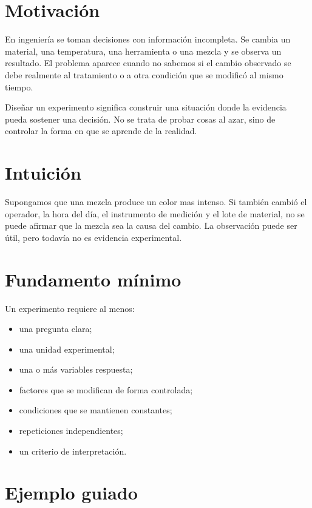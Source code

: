 
\section{Motivación}

En ingeniería se toman decisiones con información incompleta. Se cambia un material, una temperatura, una herramienta o una mezcla y se observa un resultado. El problema aparece cuando no sabemos si el cambio observado se debe realmente al tratamiento o a otra condición que se modificó al mismo tiempo.

\begin{idea}
Diseñar un experimento significa construir una situación donde la evidencia pueda sostener una decisión. No se trata de probar cosas al azar, sino de controlar la forma en que se aprende de la realidad.
\end{idea}

\section{Intuición}

Supongamos que una mezcla produce un color mas intenso. Si también cambió el operador, la hora del día, el instrumento de medición y el lote de material, no se puede afirmar que la mezcla sea la causa del cambio. La observación puede ser útil, pero todavía no es evidencia experimental.

\section{Fundamento mínimo}

Un experimento requiere al menos:

\begin{itemize}
  \item una pregunta clara;
  \item una unidad experimental;
  \item una o más variables respuesta;
  \item factores que se modifican de forma controlada;
  \item condiciones que se mantienen constantes;
  \item repeticiones independientes;
  \item un criterio de interpretación.
\end{itemize}

\section{Ejemplo guiado}

